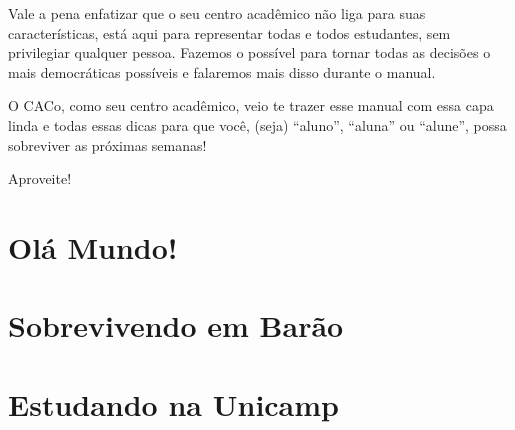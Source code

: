 \documentclass[a4paper,10pt,oldfontcommands]{memoir}
\begin{document}
Vale a pena enfatizar que o seu centro acadêmico não liga para suas
características, está aqui para representar todas e todos estudantes, sem
privilegiar qualquer pessoa. Fazemos o possível para tornar todas as decisões
o mais democráticas possíveis e falaremos mais disso durante o manual.

O CACo, como seu centro acadêmico, veio te trazer esse manual com essa capa
linda e todas essas dicas para que você, (seja) ``aluno'', ``aluna'' ou
``alune'', possa sobreviver as próximas semanas!

Aproveite!

\setlength{\parskip}{0em}
\mainmatter
\pagestyle{headings}
\twocolumn
\chapter{Olá Mundo!}


\clearpage

\onecolumn

\clearpage


\clearpage

\twocolumn


\chapter{Sobrevivendo em Barão}

\newpage

\newpage

\newpage

\newpage


\chapter{Estudando na Unicamp}

\newpage

\newpage

\newpage

\newpage

\newpage

\newpage

\newpage

\newpage

\end{document}
